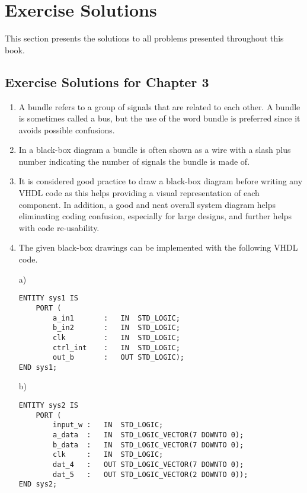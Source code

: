 \chapter{Exercise Solutions}
This section presents the solutions to all problems presented throughout
this book.

\stoptocwriting
\setcounter{section}{3}
\section*{Exercise Solutions for Chapter 3}
\begin{enumerate}
\item A bundle refers to a group of signals that are related to each other. A bundle is sometimes called a bus, but the use of the word bundle is preferred since it avoids possible confusions.

\item In a black-box diagram a bundle is often shown as a wire with a slash plus number indicating the number of signals the bundle is made of.

\item It is considered good practice to draw a black-box diagram before writing any VHDL code as this helps providing a visual representation of each component. In addition, a good and neat overall system diagram helps eliminating coding confusion, especially for large designs, and further helps with code re-usability.

\item The given black-box drawings can be implemented with the following VHDL code.

\noindent
\begin{minipage}{1\linewidth}
a)
\begin{lstlisting}[]
ENTITY sys1 IS
	PORT (
		a_in1		:	IN	STD_LOGIC;
		b_in2		:	IN	STD_LOGIC;
		clk			:	IN	STD_LOGIC;
		ctrl_int	:	IN	STD_LOGIC;
		out_b		:	OUT STD_LOGIC);
END sys1;
		\end{lstlisting}
	\end{minipage}

	\begin{minipage}{1\linewidth}
		b)
		\begin{lstlisting}[]
ENTITY sys2 IS
	PORT (
		input_w	:	IN	STD_LOGIC;
		a_data	:	IN	STD_LOGIC_VECTOR(7 DOWNTO 0);
		b_data	:	IN	STD_LOGIC_VECTOR(7 DOWNTO 0);
		clk		:	IN	STD_LOGIC;
		dat_4	:	OUT	STD_LOGIC_VECTOR(7 DOWNTO 0);
		dat_5	:	OUT	STD_LOGIC_VECTOR(2 DOWNTO 0));
END sys2;
		\end{lstlisting}
	\end{minipage}


\end{enumerate}

